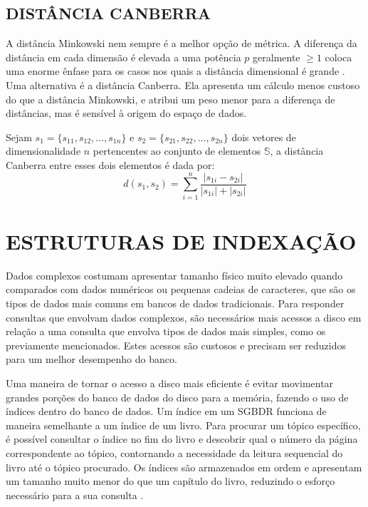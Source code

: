 \subsection{DISTÂNCIA CANBERRA}
A distância Minkowski nem sempre é a melhor opção de métrica. A diferença da distância em cada dimensão é elevada
a uma potência $p$ geralmente $\geq 1$  coloca uma enorme ênfase para os casos nos quais a distância dimensional é grande \cite{Kokare2007}.
Uma alternativa é a distância Canberra. Ela apresenta um cálculo menos custoso do que a distância Minkowski, e atribui um peso
menor para a diferença de distâncias, mas é sensível à origem do espaço de dados.
\begin{mydef}
 \label{def:canb}
 Sejam $s_1 = \{s_{11},s_{12},...,s_{1n}\}$ e $s_2 = \{s_{21},s_{22},...,s_{2n}\}$ dois vetores de dimensionalidade $n$ pertencentes ao conjunto de
  elementos $\mathbb{S}$, a distância Canberra entre esses dois elementos é dada por:
  \begin{equation}
   d(s_1,s_2) = \sum_{i=1}^{n}\frac{|s_{1i} - s_{2i}|}{|s_{1i}| + |s_{2i}|}
  \end{equation}
\end{mydef}


\section{ESTRUTURAS DE INDEXAÇÃO}
\label{sec:index}

Dados complexos costumam apresentar tamanho físico muito elevado quando comparados com dados numéricos ou pequenas cadeias de caracteres, que são os tipos de dados
mais comuns em bancos de dados tradicionais. Para responder consultas que envolvam dados complexos, são necessários mais acessos a disco em relação a uma consulta
que envolva tipos de dados mais simples, como os previamente mencionados. Estes acessos são custosos e precisam ser reduzidos para um melhor desempenho do banco.\par 

Uma maneira de tornar o acesso a disco mais eficiente é evitar movimentar grandes porções do banco de dados do disco para a memória, fazendo o uso de índices dentro do banco de dados. 
Um índice em um SGBDR funciona de maneira semelhante a um índice de um livro. Para procurar um tópico específico, é possível consultar o índice no fim do livro e descobrir qual o número da página
correspondente ao tópico, contornando a necessidade da leitura sequencial do livro até o tópico procurado. Os índices são armazenados em ordem e apresentam um tamanho
muito menor do que um capítulo do livro, reduzindo o esforço necessário para a sua consulta \cite{Silberschatz2011}.\par

